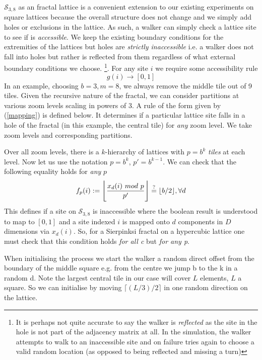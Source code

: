 \documentclass[pre,twocolumn,preprintnumbers,amsmath,amssymb,floatfix,nofootinbib]{revtex4}
\DeclarePairedDelimiter\floor{\lfloor}{\rfloor}
\begin{document}
$\mathcal{S}_{3,8}$ as an fractal lattice is a convenient extension to our existing experiments on square lattices because the overall structure does not change and we simply add holes or exclusions in the lattice. As such, a walker can simply check a lattice site to see if is \textit{accessible}. We keep the existing boundary conditions for the extremities of the lattices but holes are \textit{strictly inaccessible} i.e. a walker does not fall into holes but rather is reflected from them regardless of what external boundary conditions we choose. \footnote{It is perhaps not quite accurate to say the walker is \textit{reflected} as the site in the hole is not part of the adjacency matrix at all. In the simulation, the walker attempts to walk to an inaccessible site and on failure tries again to choose a valid random location (as opposed to being reflected and missing a turn)}. For any site $i$ we require some accessibility rule
\begin{equation}\label{mapping}
g(i) \to [0,1]
\end{equation}
In an example, choosing $b=3,m=8$, we always remove the middle tile out of 9 tiles. Given the recursive nature of the fractal, we can consider partitions at various zoom levels scaling in powers of 3. A rule of the form given by (\ref{mapping}) is defined below. It determines if a particular lattice site falls in a hole of the fractal (in this example, the central tile) for \textit{any} zoom level. We take zoom levels and corresponding partitions. 

Over all zoom levels, there is a $k$-hierarchy of lattices with $p=b^k$ \textit{tiles} at each level. Now let us use the notation $p=b^k$, $p'=b^{k-1}$. We can check that the following equality holds for \textit{any} $p$
\begin{equation}
f_p(i) := \Bigg\lfloor\frac{x_d(i)\ mod\ p}{p'}\Bigg\rfloor \overset{?}{=} \floor{b/2}, \forall d 
\end{equation}
This defines if a site on $\mathcal{S}_{3,8}$ is inaccessible where the boolean result is understood to map to $[0,1]$ and a site indexed $i$ is mapped onto $d$ components in $D$ dimensions via $x_d(i)$. So, for a Sierpinksi fractal on a hypercubic lattice one must check that this condition holds \textit{for all c} but \textit{for any p}.

When initialising the process we start the walker a random direct offset from the boundary of the middle square e.g. from the centre we jump b to the k in a random d. Note the largest central tile in our case will cover $L$ elements, $L$ a square. So we can initialise by moving $\lceil (L/3)/2 \rceil$ in one random direction on the lattice. 
\end{document}

